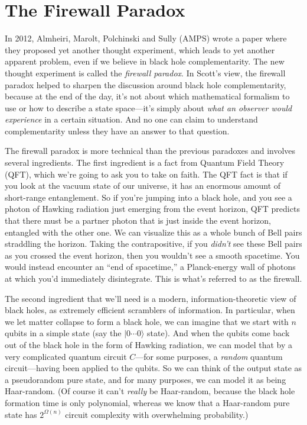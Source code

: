 \documentclass[11pt]{report}
\theoremstyle{plain}
\theoremstyle{definition}
\renewcommand{\ket}[1]{|#1\rangle}
\begin{document}
\section{The Firewall Paradox}

In 2012, Almheiri, Marolt, Polchinski and Sully (AMPS) wrote a paper \cite{amps} where they proposed yet another thought experiment,
which leads to yet another apparent problem, even if we believe in black hole complementarity.  The new thought experiment is called
the {\em firewall paradox}.  In Scott's view, the firewall paradox helped to sharpen the discussion around black hole complementarity, because
at the end of the day, it's not about which mathematical formalism to use or how to describe a state space---it's simply about {\em what an observer would experience} in a certain situation.  And no one can claim to understand complementarity unless they have an answer to that question.

The firewall paradox is more technical than the previous paradoxes
and involves several ingredients.
The first ingredient is a fact from Quantum Field Theory (QFT), which we're going to ask you to take on faith.
The QFT fact is that if you look at the vacuum state of our universe,
it has an enormous amount of short-range entanglement.
So if you're jumping into a black hole, and you see a photon of Hawking radiation
just emerging from the event horizon,
QFT predicts that there must be a partner photon that is just inside the event horizon,
entangled with the other one.
We can visualize this as a whole bunch of Bell pairs straddling the horizon.
Taking the contrapositive, if you {\em didn't} see these Bell pairs
as you crossed the event horizon, then you wouldn't see a smooth spacetime.
You would instead encounter an ``end of spacetime,'' a Planck-energy wall of photons at which
you'd immediately disintegrate.  This is what's referred to as the firewall.

The second ingredient that we'll need is a modern, information-theoretic view of
black holes, as extremely efficient scramblers of information.
In particular, when we let matter collapse to form a black hole, we can imagine that we start with $n$ qubits
in a simple state (say the $\ket{0\cdots 0}$ state).
And when the qubits come back out of the black hole
in the form of Hawking radiation,
we can model that by a very complicated quantum circuit $C$---for some purposes, a {\em random} quantum circuit---having been applied to
the qubits.
So we can think of the output state as a pseudorandom pure state,
and for many purposes, we can model it as being Haar-random.
(Of course it can't {\em really} be Haar-random, because the black hole formation time is only polynomial,
whereas we know that a Haar-random pure state has $2^{\Omega(n)}$ circuit complexity
with overwhelming probability.)
\end{document}
